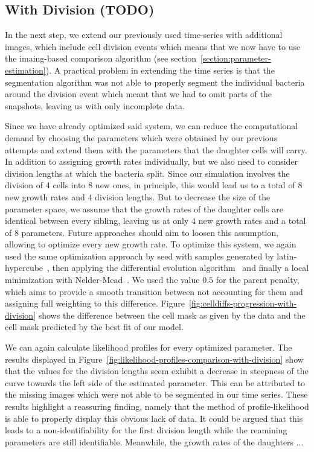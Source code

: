 \documentclass{article}
\begin{document}
\subsection{With Division (TODO)}

In the next step, we extend our previously used time-series with additional images, which include
cell division events which means that we now have to use the imaing-based comparison algorithm (see
section~\ref{section:parameter-estimation}).
A practical problem in extending the time series is that the segmentation algorithm was not able to
properly segment the individual bacteria around the division event which meant that we had to omit
parts of the snapshots, leaving us with only incomplete data.

Since we have already optimized said system, we can reduce the computational demand by choosing the
parameters which were obtained by our previous attempts and extend them with the parameters that the
daughter cells will carry.
In addition to assigning growth rates individually, but we also need to consider division lengths at
which the bacteria split.
Since our simulation involves the division of 4 cells into 8 new ones, in principle, this would lead
us to a total of $8$ new growth rates and $4$ division lengths.
But to decrease the size of the parameter space, we assume that the growth rates of the daughter
cells are identical between every sibling, leaving us at only $4$ new growth rates and a total of
$8$ parameters.
Future approaches should aim to loosen this assumption, allowing to optimize every new growth rate.
To optimize this system, we again used the same optimization approach by seed with samples generated
by latin-hypercube~\cite{McKay1979}, then applying the differential evolution
algorithm~\cite{Storn1997} and finally a local minimization with Nelder-Mead~\cite{Powell1973}.
We used the value $0.5$ for the parent penalty, which aims to provide a smooth transition between
not accounting for them and assigning full weighting to this difference.
Figure~\ref{fig:celldiffs-progression-with-division} shows the difference between the cell mask as
given by the data and the cell mask predicted by the best fit of our model.

We can again calculate likelihood profiles for every optimized parameter.
The results displayed in Figure~\ref{fig:likelihood-profiles-comparison-with-division} show that the
values for the division lengths seem exhibit a decrease in steepness of the curve towards the left
side of the estimated parameter.
This can be attributed to the missing images which were not able to be segmented in our time series.
These results highlight a reassuring finding, namely that the method of profile-likelihood is able
to properly display this obvious lack of data.
It could be argued that this leads to a non-identifiability for the first division length while the
reamining parameters are still identifiable.
Meanwhile, the growth rates of the daughters ...
\end{document}
